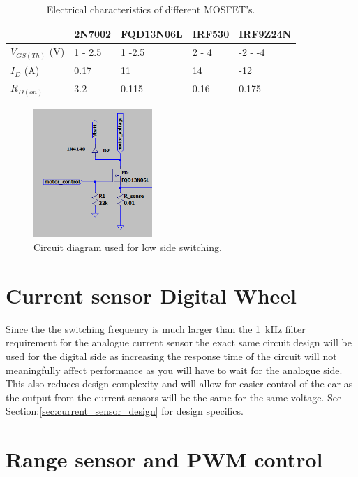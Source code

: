\begin{table}[H]
\centering
\begin{tabular}{|l|l|l|l|l|}
\hline
& 2N7002 & FQD13N06L & IRF530 & IRF9Z24N\\
\hline
$V_{GS(Th)}$ (V)  &1 - 2.5 &1 -2.5  &2 - 4  &-2 - -4   \\ 
$I_D$ (A)&0.17 &11  &14  &-12 \\ 
$R_{D(on)}$  &3.2  &0.115  &0.16  &0.175  \\ 
\hline
\end{tabular}
\caption{Electrical characteristics of different MOSFET's. \cite{2N7002} \cite{FQD13N06L} \cite{IRF530} \cite{IRF9Z24N}}
\label{tbl:nmos}
\end{table}


\begin{figure}[H]
\centering
\includegraphics[width = 0.4\textwidth]{./Figures/Low_Switch_Cir.png}
\caption{Circuit diagram used for low side switching.}
\label{fig:low_switch_cir}
\end{figure}

\section{Current sensor Digital Wheel}
Since the the switching frequency is much larger than the \SI{1}{\kilo\hertz} filter requirement for the analogue current sensor the exact same circuit design will be used for the digital side as increasing the response time of the circuit will not meaningfully affect performance as you will have to wait for the analogue side. This also reduces design complexity and will allow for easier control of the car as the output from the current sensors will be the same for the same voltage. See Section:\ref{sec:current_sensor_design} for design specifics.

\clearpage
\section{Range sensor and PWM control}
